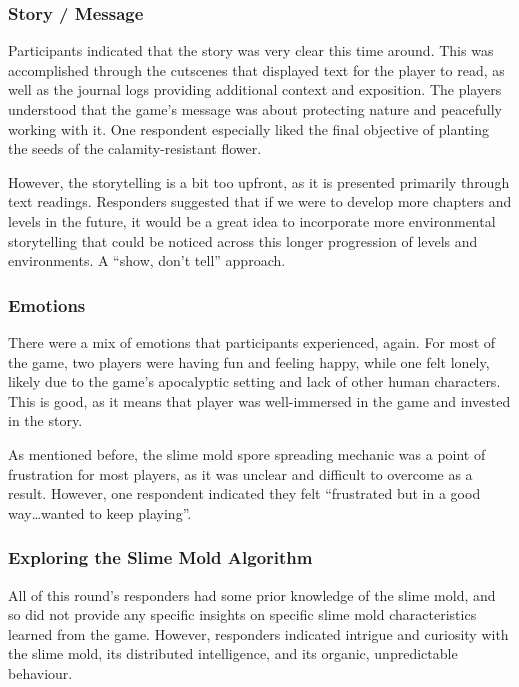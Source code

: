 \documentclass[12pt, titlepage]{article}
\begin{document}
\subsubsection{Story / Message}
Participants indicated that the story was very clear this time around. This 
was accomplished through the cutscenes that displayed text for the player to read, 
as well as the journal logs providing additional context and exposition. The players 
understood that the game's message was about protecting nature and peacefully working 
with it. One respondent especially liked the final objective of planting the seeds 
of the calamity-resistant flower.

However, the storytelling is a bit too upfront, as it is presented primarily through 
text readings. Responders suggested that if we were to develop more chapters and levels 
in the future, it would be a great idea to incorporate more environmental storytelling 
that could be noticed across this longer progression of levels and environments. A 
``show, don't tell'' approach.

\subsubsection{Emotions}
There were a mix of emotions that participants experienced, again. For most of the game, 
two players were having fun and feeling happy, while one felt lonely, likely due 
to the game's apocalyptic setting and lack of other human characters. This is good, as 
it means that player was well-immersed in the game and invested in the story.

As mentioned before, the slime mold spore spreading mechanic was a point of frustration 
for most players, as it was unclear and difficult to overcome as a result. However, 
one respondent indicated they felt ``frustrated but in a good way\dots wanted to keep playing''.

\subsubsection{Exploring the Slime Mold Algorithm}
All of this round's responders had some prior knowledge of the slime mold, and so 
did not provide any specific insights on specific slime mold characteristics 
learned from the game. However, responders indicated intrigue and curiosity with 
the slime mold, its distributed intelligence, and its organic, unpredictable behaviour.
\end{document}

